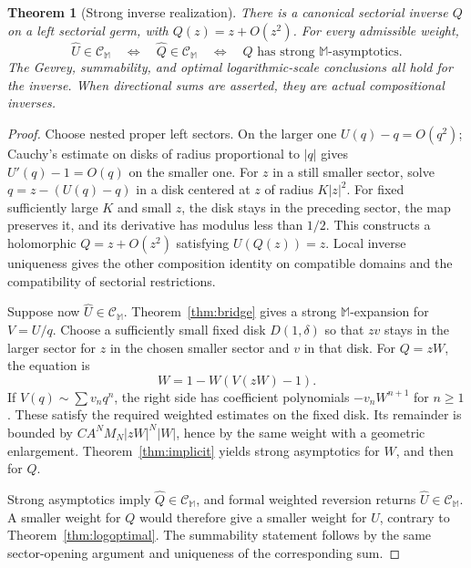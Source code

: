 \documentclass[11pt,a4paper]{article}
\numberwithin{equation}{section}
\newtheorem{theorem}{Theorem}[section]
\theoremstyle{definition}\newtheorem{definition}[theorem]{Definition}
\theoremstyle{remark}\newtheorem{remark}[theorem]{Remark}
\newcommand{\Uhat}{\widehat U}\newcommand{\Qhat}{\widehat Q}\newcommand{\Vhat}{\widehat V}
\newcommand{\M}{\mathbb M}\newcommand{\CM}{\mathcal C_{\M}}
\begin{document}
\begin{theorem}[Strong inverse realization]
\label{thm:inverse}
There is a canonical sectorial inverse $Q$ on a left sectorial germ,
with $Q(z)=z+O(z^2)$. For every admissible weight,
\begin{equation}
 \Uhat\in\CM\quad\Longleftrightarrow\quad
 \Qhat\in\CM\quad\Longleftrightarrow\quad
 Q\text{ has strong $\M$-asymptotics}.
 \label{eq:inverseequiv}
\end{equation}
The Gevrey, summability, and optimal logarithmic-scale conclusions all
hold for the inverse. When directional sums are asserted, they are actual
compositional inverses.
\end{theorem}
\begin{proof}
Choose nested proper left sectors. On the larger one $U(q)-q=O(q^2)$;
Cauchy's estimate on disks of radius proportional to $|q|$ gives
$U'(q)-1=O(q)$ on the smaller one. For $z$ in a still smaller sector,
solve $q=z-(U(q)-q)$ in a disk centered at $z$ of radius $K|z|^2$.
For fixed sufficiently large $K$ and small $z$, the disk stays in the
preceding sector, the map preserves it, and its derivative has modulus
less than $1/2$. This constructs a holomorphic $Q=z+O(z^2)$ satisfying
$U(Q(z))=z$. Local inverse uniqueness gives the other composition identity
on compatible domains and the compatibility of sectorial restrictions.

Suppose now $\Uhat\in\CM$. Theorem~\ref{thm:bridge} gives a strong
$\M$-expansion for $V=U/q$. Choose a sufficiently small fixed disk
$D(1,\delta)$ so that $zv$ stays in the larger sector for $z$ in the
chosen smaller sector and $v$ in that disk. For $Q=zW$, the equation is
\begin{equation}
 W=1-W(V(zW)-1).
 \label{eq:inverse-analytic}
\end{equation}
If $V(q)\sim\sum v_nq^n$, the right side has coefficient polynomials
$-v_nW^{n+1}$ for $n\ge1$. These satisfy the required weighted estimates
on the fixed disk. Its remainder is bounded by
$CA^NM_N|zW|^N|W|$, hence by the same weight with a geometric enlargement.
Theorem~\ref{thm:implicit} yields strong asymptotics for $W$, and then
for $Q$.

Strong asymptotics imply $\Qhat\in\CM$, and formal weighted reversion
returns $\Uhat\in\CM$. A smaller weight for $Q$ would therefore give a
smaller weight for $U$, contrary to Theorem~\ref{thm:logoptimal}.
The summability statement follows by the same sector-opening argument
and uniqueness of the corresponding sum.
\end{proof}
\end{document}
